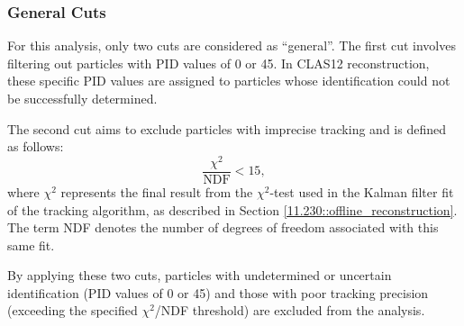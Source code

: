 \subsubsection{General Cuts}
\label{13.21::general_cuts}
    For this analysis, only two cuts are considered as ``general''.
    The first cut involves filtering out particles with PID values of 0 or 45.
    In CLAS12 reconstruction, these specific PID values are assigned to particles whose identification could not be successfully determined.

    The second cut aims to exclude particles with imprecise tracking and is defined as follows:
    \begin{equation*}
        \frac{\chi^2}{\text{NDF}} < 15,
    \end{equation*}
    where $\chi^2$ represents the final result from the $\chi^2$-test used in the Kalman filter fit of the tracking algorithm, as described in Section \ref{11.230::offline_reconstruction}.
    The term NDF denotes the number of degrees of freedom associated with this same fit.

    By applying these two cuts, particles with undetermined or uncertain identification (PID values of 0 or 45) and those with poor tracking precision (exceeding the specified $\chi^2$/NDF threshold) are excluded from the analysis.
